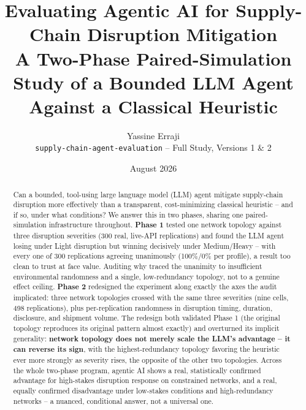 \documentclass[10pt,twocolumn]{article}
\title{\vspace{-1.2em}\textbf{Evaluating Agentic AI for Supply-Chain Disruption Mitigation}\\
\large A Two-Phase Paired-Simulation Study of a Bounded LLM Agent Against a Classical Heuristic}
\author{\small Yassine Erraji \\[-2pt] \small \texttt{supply-chain-agent-evaluation} -- Full Study, Versions 1 \& 2}
\date{\small August 2026}
\begin{document}
\maketitle
\vspace{-1.8em}

\begin{abstract}
\noindent Can a bounded, tool-using large language model (LLM) agent mitigate supply-chain disruption more effectively than a transparent, cost-minimizing classical heuristic -- and if so, under what conditions? We answer this in two phases, sharing one paired-simulation infrastructure throughout. \textbf{Phase 1} tested one network topology against three disruption severities (300 real, live-API replications) and found the LLM agent losing under Light disruption but winning decisively under Medium/Heavy -- with every one of 300 replications agreeing unanimously (100\%/0\% per profile), a result too clean to trust at face value. Auditing why traced the unanimity to insufficient environmental randomness and a single, low-redundancy topology, not to a genuine effect ceiling. \textbf{Phase 2} redesigned the experiment along exactly the axes the audit implicated: three network topologies crossed with the same three severities (nine cells, 498 replications), plus per-replication randomness in disruption timing, duration, disclosure, and shipment volume. The redesign both validated Phase 1 (the original topology reproduces its original pattern almost exactly) and overturned its implicit generality: \textbf{network topology does not merely scale the LLM's advantage -- it can reverse its sign}, with the highest-redundancy topology favoring the heuristic ever more strongly as severity rises, the opposite of the other two topologies. Across the whole two-phase program, agentic AI shows a real, statistically confirmed advantage for high-stakes disruption response on constrained networks, and a real, equally confirmed disadvantage under low-stakes conditions and high-redundancy networks -- a nuanced, conditional answer, not a universal one.
\end{abstract}
\end{document}
